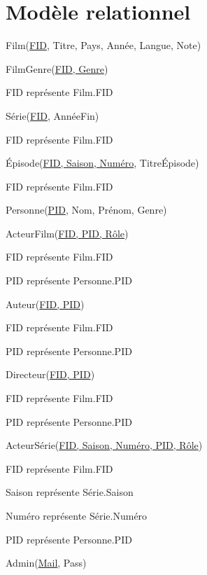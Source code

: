 \documentclass[a4paper,12pt]{article}
\begin{document}
\section{Modèle relationnel}
Film(\underline{FID}, Titre, Pays, Année, Langue, Note)

FilmGenre(\underline{FID, Genre})
\begin{list}{-}{}
  \item FID représente Film.FID
\end{list}

Série(\underline{FID}, AnnéeFin)
\begin{list}{-}{}
  \item FID représente Film.FID
\end{list}

Épisode(\underline{FID, Saison, Numéro}, TitreÉpisode)
\begin{list}{-}{}
  \item FID représente Film.FID
\end{list}

Personne(\underline{PID}, Nom, Prénom, Genre)

ActeurFilm(\underline{FID, PID, Rôle})
\begin{list}{-}{}
  \item FID représente Film.FID
  \item PID représente Personne.PID
\end{list}

Auteur(\underline{FID, PID})
\begin{list}{-}{}
  \item FID représente Film.FID
  \item PID représente Personne.PID
\end{list}

Directeur(\underline{FID, PID})
\begin{list}{-}{}
  \item FID représente Film.FID
  \item PID représente Personne.PID
\end{list}

ActeurSérie(\underline{FID, Saison, Numéro, PID, Rôle})
\begin{list}{-}{}
  \item FID représente Film.FID
  \item Saison représente Série.Saison
  \item Numéro représente Série.Numéro
  \item PID représente Personne.PID
\end{list}

Admin(\underline{Mail}, Pass)
\end{document}
